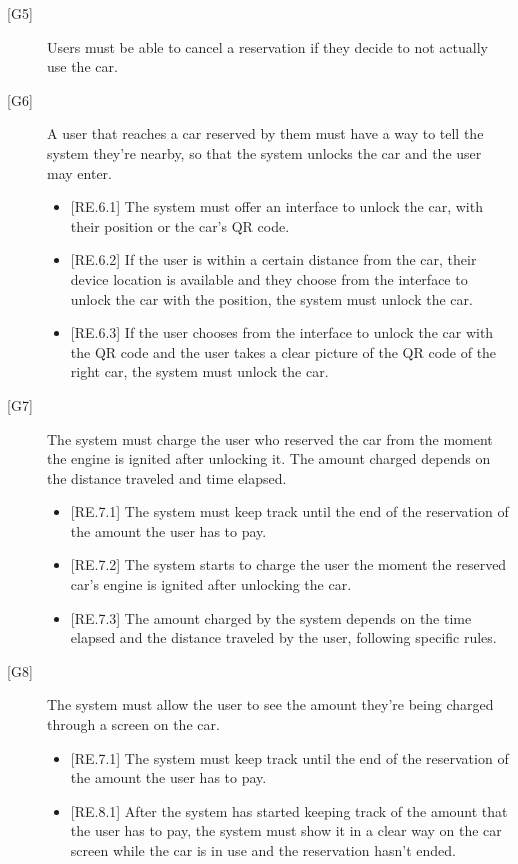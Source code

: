 \documentclass[english]{article}
\begin{document}
\begin{description}
\item[{[G5]}]{Users must be able to cancel a reservation if they decide to not actually use the car.}

\item[{[G6]}]{A user that reaches a car reserved by them must have a way to tell the system they’re nearby, so that the system unlocks the car and the user may enter.
\begin{itemize}
	\item{[RE.6.1] The system must offer an interface to unlock the car, with their position or the car's QR code.}
	\item{[RE.6.2] If the user is within a certain distance from the car, their device location is available and they choose from the interface to unlock the car with the position, the system must unlock the car.}
	\item{[RE.6.3] If the user chooses from the interface to unlock the car with the QR code and the user takes a clear picture of the QR code of the right car, the system must unlock the car.}
\end{itemize}
}

\item[{[G7]}]{The system must charge the user who reserved the car from the moment the engine is ignited after unlocking it. The amount charged depends on the distance traveled and time elapsed.
\begin{itemize}
	\item{[RE.7.1] The system must keep track until the end of the reservation of the amount the user has to pay.}
	\item{[RE.7.2] The system starts to charge the user the moment the reserved car’s engine is ignited after unlocking the car.}
	\item{[RE.7.3] The amount charged by the system depends on the time elapsed and the distance traveled by the user, following specific rules.}
\end{itemize}
}

\item[{[G8]}]{The system must allow the user to see the amount they’re being charged through a screen on the car.
\begin{itemize}
	\item{[RE.7.1] The system must keep track until the end of the reservation of the amount the user has to pay.}
	\item{[RE.8.1] After the system has started keeping track of the amount that the user has to pay, the system must show it in a clear way on the car screen while the car is in use and the reservation hasn’t ended.}
\end{itemize}
}


\end{description}
\end{document}
